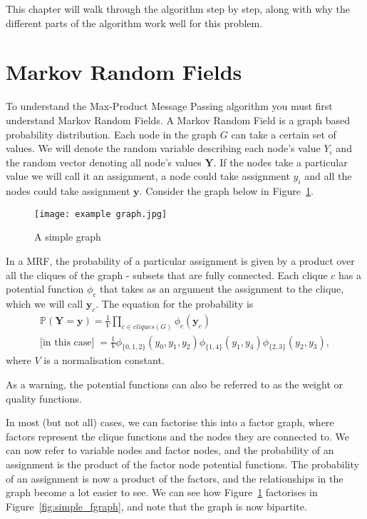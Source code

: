This chapter will walk through the algorithm step by step, along with why the different parts of the algorithm work well for this problem.

\section{Markov Random Fields}
\label{sec:mrfs}
To understand the Max-Product Message Passing algorithm you must first understand Markov Random Fields.
A Markov Random Field is a graph based probability distribution.
Each node in the graph $G$ can take a certain set of values.
We will denote the random variable describing each node's value $Y_i$ and the random vector denoting all node's values $\mathbf{Y}$.
If the nodes take a particular value we will call it an assignment, a node could take assignment $y_i$ and all the nodes could take assignment $\mathbf{y}$.
Consider the graph below in Figure~\ref{fig:simple_graph}.

\begin{figure}[h]
    \centering
    \texttt{[image: example graph.jpg]}
    \caption{A simple graph}
    \label{fig:simple_graph}
\end{figure}

In a MRF, the probability of a particular assignment is given by a product over all the cliques of the graph - subsets that are fully connected.
Each clique $c$ has a potential function $\phi_c$ that takes as an argument the assignment to the clique, which we will call $\mathbf{y}_c$.
The equation for the probability is
\begin{gather}
    \mathbb{P}(\mathbf{Y} = \mathbf{y}) = \frac{1}{V} \prod_{c \in cliques(G)} \phi_c (\mathbf{y}_c) \label{eq:mrf} \\
    \text{[in this case]}\; = \frac{1}{V} \phi_{\{0, 1, 2\}}(y_0, y_1, y_2) \phi_{\{1, 4\}}(y_1, y_4) \phi_{\{2, 3\}}(y_2, y_3),
\end{gather}
where $V$ is a normalisation constant.

As a warning, the potential functions can also be referred to as the weight or quality functions.

In most (but not all) cases, we can factorise this into a factor graph, where factors represent the clique functions and the nodes they are connected to.
We can now refer to variable nodes and factor nodes, and the probability of an assignment is the product of the factor node potential functions.
The probability of an assignment is now a product of the factors, and the relationships in the graph become a lot easier to see.
We can see how Figure~\ref{fig:simple_graph} factorises in Figure~\ref{fig:simple_fgraph}, and note that the graph is now bipartite.


